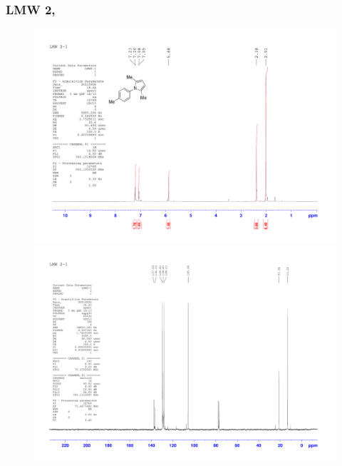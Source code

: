 \documentclass[12pt, a4paper,titlepage]{article}
\begin{document}
{\subsubsection*{LMW 2, \pageref{exp:LMW2}}
\label{spec:LMW2}
	\begin{figure}[H] 
	\begin{center}
	\includegraphics[width=14.5cm]{expdata/LMW2/1H}
	\includegraphics[width=14.5cm]{expdata/LMW2/13C}
	\end{center}
	\end{figure}


}
\end{document}
